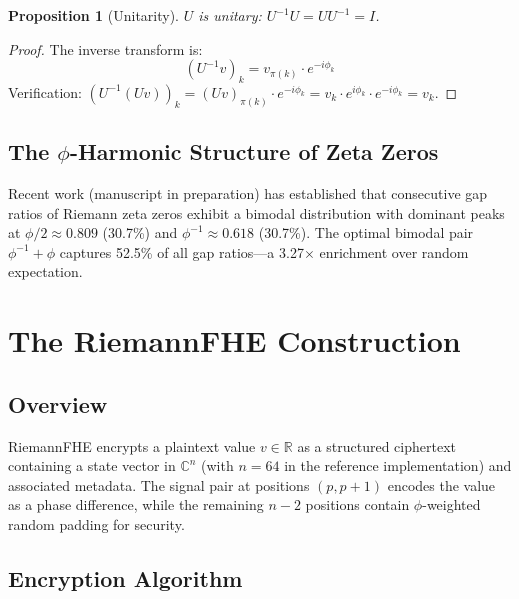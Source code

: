 \documentclass[11pt,a4paper]{article}
\newtheorem{proposition}[theorem]{Proposition}
\theoremstyle{remark}
\begin{document}
\begin{proposition}[Unitarity]
$U$ is unitary: $U^{-1}U = UU^{-1} = I$.
\end{proposition}
\begin{proof}
The inverse transform is:
\begin{equation}
    (U^{-1}v)_k = v_{\pi(k)} \cdot e^{-i\phi_k}
\end{equation}
Verification: $(U^{-1}(Uv))_k = (Uv)_{\pi(k)} \cdot e^{-i\phi_k} = v_k \cdot e^{i\phi_k} \cdot e^{-i\phi_k} = v_k$.
\end{proof}

\subsection{The $\phi$-Harmonic Structure of Zeta Zeros}

Recent work \cite{fernandez2026zeta} (manuscript in preparation) has established that consecutive gap ratios of Riemann zeta zeros exhibit a bimodal distribution with dominant peaks at $\phi/2 \approx 0.809$ (30.7\%) and $\phi^{-1} \approx 0.618$ (30.7\%). The optimal bimodal pair $\phi^{-1} + \phi$ captures 52.5\% of all gap ratios—a 3.27$\times$ enrichment over random expectation.

\section{The RiemannFHE Construction}

\subsection{Overview}

RiemannFHE encrypts a plaintext value $v \in \mathbb{R}$ as a structured ciphertext containing a state vector in $\mathbb{C}^n$ (with $n=64$ in the reference implementation) and associated metadata. The signal pair at positions $(p, p+1)$ encodes the value as a phase difference, while the remaining $n-2$ positions contain $\phi$-weighted random padding for security.

\subsection{Encryption Algorithm}
\end{document}
